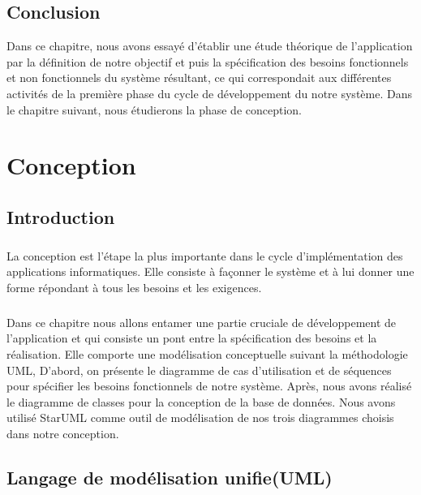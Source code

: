 \documentclass[12pt, openany]{report}
\begin{document}
\section{Conclusion}
Dans ce chapitre, nous avons essayé d’établir une étude théorique de l’application par la définition de notre objectif et puis la spécification des besoins fonctionnels et non fonctionnels du système résultant, ce qui correspondait aux différentes activités de la première phase du cycle de développement du notre système. Dans le chapitre suivant, nous étudierons la phase de conception. 




\chapter{Conception}
\newpage
\section{Introduction}
\large
\paragraph{} La conception est l’étape la plus importante dans le cycle d’implémentation des applications informatiques. Elle consiste à façonner le système et à lui donner une forme répondant à tous les besoins et les exigences. 
\paragraph{}Dans ce chapitre nous allons entamer une  partie cruciale de développement de l’application et qui consiste un pont entre la spécification des besoins et la réalisation. Elle comporte une modélisation conceptuelle suivant la méthodologie UML, D’abord, on présente le diagramme de cas d’utilisation et de séquences pour spécifier les besoins fonctionnels de notre système. Après, nous avons réalisé le diagramme de classes pour la conception de la base de données. Nous avons utilisé StarUML comme outil de modélisation de nos trois diagrammes choisis dans notre conception.
\section{Langage de modélisation unifie(UML)}
\end{document}
